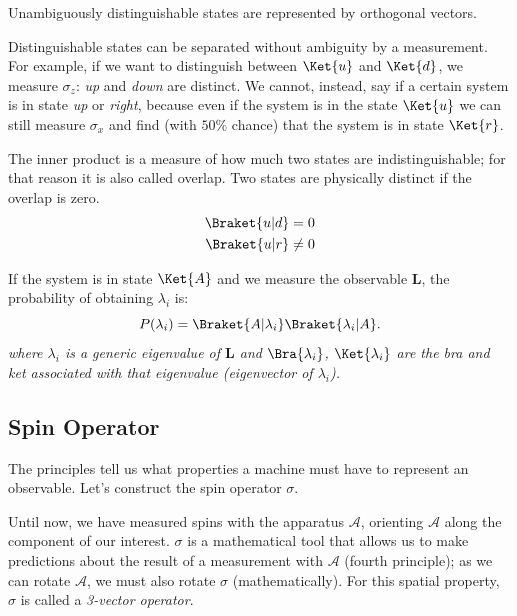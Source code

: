 \begin{principles}
	Unambiguously distinguishable states are represented by orthogonal vectors.
\end{principles}
Distinguishable states can be separated without ambiguity by a measurement. For example, if we want to distinguish between $\Ket{u}$ and $\Ket{d}$, we measure $\sigma_z$: \emph{up} and \emph{down} are distinct. We cannot, instead, say if a certain system is in state \emph{up} or \emph{right}, because even if the system is in the state $\Ket{u}$ we can still measure $\sigma_x$ and find (with $50\%$ chance) that the system is in state $\Ket{r}$.

The  inner product is a measure of how much two states are indistinguishable; for that reason it is also called overlap. Two states are physically distinct if the overlap is zero.
\begin{align*}
	\Braket{u|d} &= 0\\
	\Braket{u|r} &\neq 0
\end{align*}

\begin{principles}
	If the system is in state $\Ket{A}$ and we measure the observable $\mathbf{L}$, the probability of obtaining $\lambda_i$ is:
	\[
	P(\lambda_i) = \Braket{A|\lambda_i}\Braket{\lambda_i|A}.
	\]
	\emph{where $\lambda_i$ is a generic eigenvalue of $\mathbf{L}$ and $\Bra{\lambda_i}$, $\Ket{\lambda_i}$ are the bra and ket associated with that eigenvalue (eigenvector of $\lambda_i$).}
\end{principles}

\subsection{Spin Operator}
The principles tell us what properties a machine must have to represent an observable. Let's construct the spin operator $\sigma$.

Until now, we have measured spins with the apparatus $\mathcal{A}$, orienting $\mathcal{A}$ along the component of our interest. $\sigma$ is a mathematical tool that allows us to make predictions about the result of a measurement with $\mathcal{A}$ (fourth principle); as we can rotate $\mathcal{A}$, we must also rotate $\sigma$ (mathematically). For this spatial property, $\sigma$ is called a \emph{3-vector operator}.

